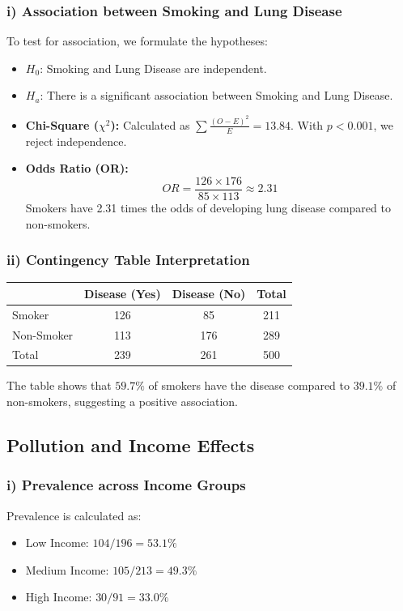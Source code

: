 \documentclass[12pt]{article}
\begin{document}
\subsubsection{i) Association between Smoking and Lung Disease}
To test for association, we formulate the hypotheses:
\begin{itemize}
    \item $H_0$: Smoking and Lung Disease are independent.
    \item $H_a$: There is a significant association between Smoking and Lung Disease.

    \item \textbf{Chi-Square ($\chi^2$):} Calculated as $\sum \frac{(O-E)^2}{E} = 13.84$. With $p < 0.001$, we reject independence.
    \item \textbf{Odds Ratio (OR):} 
    \[ OR = \frac{126 \times 176}{85 \times 113} \approx 2.31 \]
    Smokers have 2.31 times the odds of developing lung disease compared to non-smokers.

\end{itemize}
\subsubsection{ii) Contingency Table Interpretation}
\begin{table}[h!]
\centering
\begin{tabular}{@{}lccc@{}}
\toprule
 & Disease (Yes) & Disease (No) & Total \\ \midrule
Smoker & 126 & 85 & 211 \\
Non-Smoker & 113 & 176 & 289 \\ \midrule
Total & 239 & 261 & 500 \\ \bottomrule
\end{tabular}
\end{table}
The table shows that $59.7\%$ of smokers have the disease compared to $39.1\%$ of non-smokers, suggesting a positive association.

\subsection{Pollution and Income Effects}
\subsubsection{i) Prevalence across Income Groups}
Prevalence is calculated as:
\begin{itemize}
    \item Low Income: $104/196 = 53.1\%$
    \item Medium Income: $105/213 = 49.3\%$
    \item High Income: $30/91 = 33.0\%$
\end{itemize}
\end{document}
